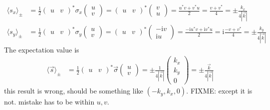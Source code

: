 \documentclass[english, parskip=full]{scrartcl}
\newcommand{\bra}{}
\def\I{\text{i}}
\begin{document}
\begin{align*}
\bra\langle {s_x}\rangle_\pm&=\frac{1}{2}\begin{pmatrix}
u&v
\end{pmatrix}^\ast \sigma_x\begin{pmatrix}
u \\ v
\end{pmatrix}=\begin{pmatrix}
u&v
\end{pmatrix}^\ast \begin{pmatrix}
v \\ u
\end{pmatrix}=\frac{u^\ast v+v^\ast u}{2}=\frac{v+v^\ast}{4}=\pm\frac{k_x}{4|\vec{k}|}\\
\bra\langle {s_y}\rangle_\pm&=\frac{1}{2}\begin{pmatrix}
u&v
\end{pmatrix}^\ast \sigma_y\begin{pmatrix}
u \\ v
\end{pmatrix}=\begin{pmatrix}
u&v
\end{pmatrix}^\ast \begin{pmatrix}
-\I v \\ \I u
\end{pmatrix}=\frac{-\I u^\ast v+\I v^\ast u}{2}=\I\frac{-v+v^\ast}{4}=\pm\frac{k_y}{4|\vec{k}|}
\end{align*} 
The expectation value is
\begin{align*}
\bra\langle {\vec{s}}\rangle_\pm&=\frac{1}{2}\begin{pmatrix}
u&v
\end{pmatrix}^\ast \vec{\sigma}\begin{pmatrix}
u \\ v
\end{pmatrix}=\pm\frac{1}{4|\vec{k}|}\begin{pmatrix}
k_x \\ k_y \\ 0
\end{pmatrix}=\pm\frac{\vec{k}}{4|\vec{k}|}
\end{align*}
this result is wrong, should be something like $(-k_y,k_x,0)$. FIXME: except it is not. mistake has to be within $u,v$.
\end{document}
